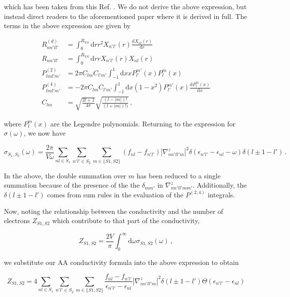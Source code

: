 \documentclass[preprint,aps]{revtex4-2}
\begin{document}
which has been taken from this Ref. .
We do not derive the above expression, but instead direct readers to the
aforementioned paper where it is derived in full. The terms in the above
expression are given by

\begin{align}
R^{(d)}_{nn'll'} &= \int_0^{R_\textrm{VS}} \textrm{d}r r^2 X_{n'l'}(r) \frac{\textrm{d}X_{nl}(r)}{\textrm{d}r}\\
 R_{nn'll'} &= \int_0^{R_\textrm{VS}} \textrm{d}r r X_{n'l'}(r) X_{nl}(r) \\
 P^{(2)}_{lml'm'} &= 2\pi C_{lm}C_{l'm'} \int_{-1}^{1} \textrm{d}x x P_{l'}^{m'} (x) P_{l}^{m}(x) \\
 P^{(4)}_{lml'm'} &= -2\pi C_{lm}C_{l'm'} \int_{-1}^{1} \textrm{d}x (1-x^2) P_{l'}^{m'} (x) \frac{\textrm{d}P_l^m(x)}{\textrm{d}x}\\
 C_{lm} &= \sqrt{\frac{2l+1}{4\pi}}\sqrt{\frac{(l-|m|)!}{(l+|m|)!)}}\,,
\end{align}

where \(P_l^m(x)\) are the Legendre polynomials. Returning to the
expression for \(\sigma(\omega)\), we now have

\begin{equation}
\sigma_{S_1,S_2}(\omega) = \frac{2\pi}{V\omega} \sum_{nl\in S_1} \sum_{n'l'\in S_2} \sum_{m\in \{S1,S2\}} (f_{nl} - f_{n'l'}) |\nabla_{nn'll'm}^z|^2 \delta (\epsilon_{n'l'} - \epsilon_{nl} - \omega) \delta(l\pm 1 - l')\,.
\end{equation}

In the above, the double summation over \(m\) has been reduced to a
single summation because of the presence of the the \(\delta_{mm'}\) in
\(\nabla_{nn'll'mm'}^z\). Additionally, the \(\delta(l\pm 1 - l')\)
comes from sum rules in the evaluation of the \(P^{(2,4)}\) integrals.

Now, noting the relationship between the conductivity and the number of
electrons \(Z_{S1,S2}\) which contribute to that part of the
conductivity,

\begin{equation}
Z_{S1,S2} = \frac{2V}{\pi} \int_0^\infty \textrm{d}\omega \sigma_{S1,S2}(\omega)\,, 
\end{equation}

we substitute our AA conductivity formula into the above expression to
obtain

\begin{equation}
Z_{S1,S2} = 4 \sum_{nl\in S_1} \sum_{n'l'\in S_2} \sum_{m\in \{S1,S2\}} \frac{f_{nl} - f_{n'l'}}{\epsilon_{n'l'}-\epsilon_{nl}}|\nabla_{nn'll'm}^z|^2 \delta(l\pm 1 - l') \Theta (\epsilon_{n'l'}-\epsilon_{nl})
\end{equation}
\end{document}
